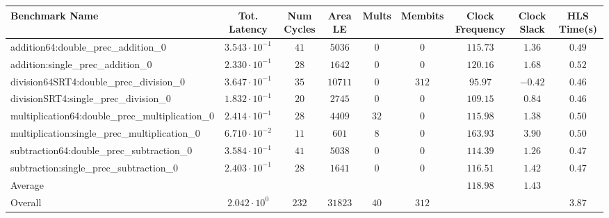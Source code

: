 \begin{tabular}{|l|c|c|c|c|c|c|c|c|}
\hline
Benchmark Name                                   & Tot. Latency            & Num Cycles & Area LE   & Mults  & Membits & Clock Frequency & Clock Slack & HLS Time(s) \\
\hline
addition64:double\_prec\_addition\_0             & $ 3.543 \cdot 10^{-1} $ & $ 41     $ & $ 5036  $ & $ 0  $ & $ 0   $ & $ 115.73      $ & $ 1.36    $ & $ 0.49    $ \\
addition:single\_prec\_addition\_0               & $ 2.330 \cdot 10^{-1} $ & $ 28     $ & $ 1642  $ & $ 0  $ & $ 0   $ & $ 120.16      $ & $ 1.68    $ & $ 0.52    $ \\
division64SRT4:double\_prec\_division\_0         & $ 3.647 \cdot 10^{-1} $ & $ 35     $ & $ 10711 $ & $ 0  $ & $ 312 $ & $ 95.97       $ & $ -0.42   $ & $ 0.46    $ \\
divisionSRT4:single\_prec\_division\_0           & $ 1.832 \cdot 10^{-1} $ & $ 20     $ & $ 2745  $ & $ 0  $ & $ 0   $ & $ 109.15      $ & $ 0.84    $ & $ 0.46    $ \\
multiplication64:double\_prec\_multiplication\_0 & $ 2.414 \cdot 10^{-1} $ & $ 28     $ & $ 4409  $ & $ 32 $ & $ 0   $ & $ 115.98      $ & $ 1.38    $ & $ 0.50    $ \\
multiplication:single\_prec\_multiplication\_0   & $ 6.710 \cdot 10^{-2} $ & $ 11     $ & $ 601   $ & $ 8  $ & $ 0   $ & $ 163.93      $ & $ 3.90    $ & $ 0.50    $ \\
subtraction64:double\_prec\_subtraction\_0       & $ 3.584 \cdot 10^{-1} $ & $ 41     $ & $ 5038  $ & $ 0  $ & $ 0   $ & $ 114.39      $ & $ 1.26    $ & $ 0.47    $ \\
subtraction:single\_prec\_subtraction\_0         & $ 2.403 \cdot 10^{-1} $ & $ 28     $ & $ 1641  $ & $ 0  $ & $ 0   $ & $ 116.51      $ & $ 1.42    $ & $ 0.47    $ \\
\hline
Average                                          & $                     $ & $        $ & $       $ & $    $ & $     $ & $ 118.98      $ & $ 1.43    $ & $         $ \\
\hline
Overall                                          & $ 2.042 \cdot 10^{0}  $ & $ 232    $ & $ 31823 $ & $ 40 $ & $ 312 $ & $             $ & $         $ & $ 3.87    $ \\
\hline
\end{tabular}
